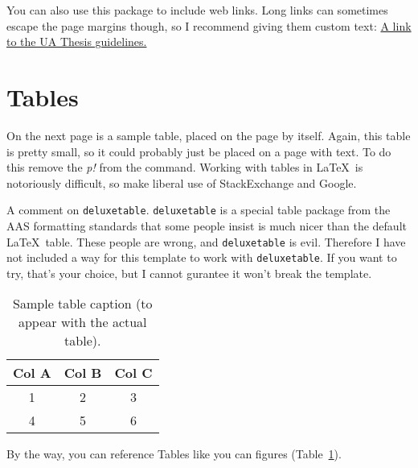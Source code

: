 You can also use this package to include web links. Long links can sometimes escape the page margins though, so I recommend
giving them custom text: \href{https://grad.arizona.edu/gsas/dissertations-theses/dissertation-and-thesis-formatting-guides}
{A link to the UA Thesis guidelines.}

\section{Tables}
On the next page is a sample table, placed on the page by itself. Again, this table is pretty small, so it could 
probably just be placed on a page with text. To do this remove the \emph{p!} from the command. Working with tables in
\LaTeX\ is notoriously difficult, so make liberal use of StackExchange and Google. 

A comment on \texttt{deluxetable}. \texttt{deluxetable} is a special table package from the AAS formatting standards that
some people insist is much nicer than the default \LaTeX\ table. These people are wrong, and \texttt{deluxetable} is evil.
Therefore I have not included a way for this template to work with \texttt{deluxetable}. If you want to try, that's your
choice, but I cannot gurantee it won't break the template.

\begin{table}[p!]
\begin{center}
\caption[Short table caption for LOT]{Sample table caption (to appear with the actual table). \label{sampletable}}
\vspace{0.3in}
\begin{tabular}{ccc}
\hline 
\hline
Col A & Col B & Col C \\
\hline
1 & 2 & 3 \\
4 & 5 & 6\\
\hline
\end{tabular}
\end{center}
\end{table}

By the way, you can reference Tables like you can figures (Table~\ref{sampletable}).